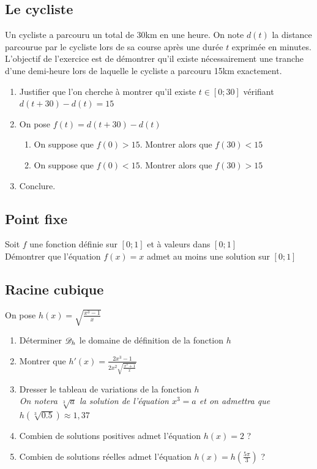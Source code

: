 \documentclass[oneside,12pt]{book}          %
\begin{document}
\subsection{Le cycliste}
Un cycliste a parcouru un total de 30km en une heure. On note $d(t)$ la distance parcourue par le cycliste lors de sa course après une durée $t$ exprimée en minutes.\\
L'objectif de l'exercice est de démontrer qu'il existe nécessairement une tranche d'une demi-heure lors de laquelle le cycliste a parcouru 15km exactement.
\begin{enumerate}
	\item Justifier que l'on cherche à montrer qu'il existe $t\in[0;30]$ vérifiant $d(t+30)-d(t)=15$
	\item On pose $f(t)=d(t+30)-d(t)$
	\begin{enumerate}
		\item On suppose que $f(0)>15$. Montrer alors que $f(30)<15$
		\item On suppose que $f(0)<15$. Montrer alors que $f(30)>15$
	\end{enumerate}
	\item Conclure.
\end{enumerate}



\subsection{Point fixe}
Soit $f$ une fonction définie sur $[0;1]$ et à valeurs dans $[0;1]$\\
Démontrer que l'équation $f(x)=x$ admet au moins une solution sur $[0;1]$



\subsection{Racine cubique}
On pose $h(x)=\sqrt{\frac{x^3-1}{x}}$
\begin{enumerate}
    \item Déterminer ${\mathscr{D}}_h$ le domaine de définition de la fonction $h$
    \item Montrer que $h'(x)=\frac{2x^3-1}{2x^2\sqrt{\frac{x^3+1}{x}}}$
    \item Dresser le tableau de variations de la fonction $h$\\
    \textit{On notera $\sqrt[3]{a}$ la solution de l'équation $x^3=a$ et on admettra que $h\left(\sqrt[3]{0.5}\right)\approx1,37$}
    \item Combien de solutions positives admet l'équation $h(x)=2$ ?
    \item Combien de solutions réelles admet l'équation $h(x)=h\left(\frac{5\pi}{3}\right)$ ?
\end{enumerate}
\end{document}
